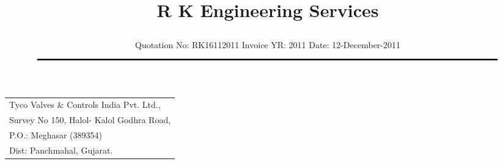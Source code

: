 \documentclass[11pt,A4]{article}
\title{\vspace*{-1.5cm} \centerline{ \Huge \bf \hspace{0cm} R K Engineering Services}\vspace*{-0.75cm}}
\author{%
 \scriptsize Quotation No: RK16112011  \hspace*{4cm}  Invoice YR: 2011 \hspace*{4cm} Date: 12-December-2011\\
$\rule{7.5in}{0.5mm}$}
\date{}
\begin{document}
\maketitle
\thispagestyle{empty}
\vspace*{0.5cm}	
\begin{flushleft}
{\footnotesize
\begin{tabular}{l}
Tyco Valves \& Controls India Pvt. Ltd.,\\
Survey No 150, Halol- Kalol Godhra Road,\\
P.O.:  Meghasar (389354)\\
Dist: Panchmahal, Gujarat.\\
\end{tabular}
}
\end{flushleft}

\vspace*{1cm}

\vspace*{0.5cm}

\end{document}
